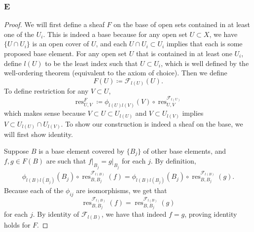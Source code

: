 \documentclass{article}
\newcommand{\fF}{\mathscr{F}}
\DeclareMathOperator{\res}{res}
\begin{document}
\subsubsection{E}\label{2.5.E}
\begin{proof}
    We will first define a sheaf $F$ on the base of open sets contained in at least one of the $U_i$. This is indeed a base because for any open set $U\subset X$, we have $\{U\cap U_i\}$ is an open cover of $U$, and each $U\cap U_i\subset U_i$ implies that each is some proposed base element. For any open set $U$ that is contained in at least one $U_i$, define $l(U)$ to be the least index such that $U\subset U_i$, which is well defined by the well-ordering theorem (equivalent to the axiom of choice). Then we define
    \[
    F(U)\coloneqq \fF_{l(U)} (U).
    \]
    To define restriction for any $V\subset U$, 
    \[
    \res_{U,V}^F\coloneqq \phi_{l(U)l(V)}(V)\circ \res_{U,V}^{\fF_{l(U)}}
    \]
    which makes sense because $V\subset U\subset U_{l(U)}$ and $V\subset U_{l(V)}$ implies $V\subset U_{l(U)}\cap U_{l(V)}$. To show our construction is indeed a sheaf on the base, we will first show identity.

    \vspace{0.1in}
    Suppose $B$ is a base element covered by $\{B_j\}$ of other base elements, and $f,g\in F(B)$ are such that $f\vert_{B_j}=g\vert_{B_j}$ for each $j$. By definition,
    \begin{align*}
        \phi_{l(B)l(B_j)}(B_j)\circ \res_{B,B_j}^{\fF_{l(B)}}(f)=\phi_{l(B)l(B_j)}(B_j)\circ \res_{B,B_j}^{\fF_{l(B)}}(g).
    \end{align*}
    Because each of the $\phi_{ij}$ are isomorphisms, we get that
    \[
    \res_{B,B_j}^{\fF_{l(B)}}(f)=\res_{B,B_j}^{\fF_{l(B)}}(g)
    \]
    for each $j$. By identity of $\fF_{l(B)}$, we have that indeed $f=g$, proving identity holds for $F$.


\end{proof}
\end{document}
